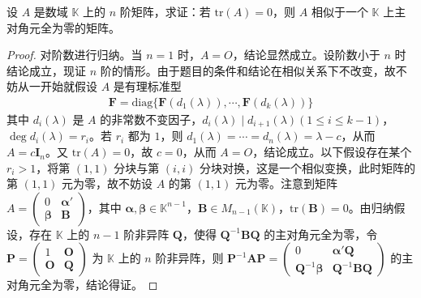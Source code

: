 \documentclass[../../main.tex]{subfiles}
\begin{document}
\begin{proposition}\label{proposition:迹零阵必相似于主对角全为零的矩阵}
设 $A$ 是数域 $\mathbb{K}$ 上的 $n$ 阶矩阵，求证：若 $\mathrm{tr}(A)=0$，则 $A$ 相似于一个 $\mathbb{K}$ 上主对角元全为零的矩阵。
\end{proposition}
\begin{proof}
对阶数进行归纳。当 $n = 1$ 时，$A = O$，结论显然成立。设阶数小于 $n$ 时结论成立，现证 $n$ 阶的情形。由于题目的条件和结论在相似关系下不改变，故不妨从一开始就假设 $A$ 是有理标准型
\begin{align*}
\boldsymbol{F}=\mathrm{diag}\{\boldsymbol{F}(d_1(\lambda)),\cdots,\boldsymbol{F}(d_k(\lambda))\}
\end{align*}
其中 $d_i(\lambda)$ 是 $A$ 的非常数不变因子，$d_i(\lambda)\mid d_{i + 1}(\lambda) (1\leq i\leq k - 1)$，$\deg d_i(\lambda)=r_i$。若 $r_i$ 都为 $1$，则 $d_1(\lambda)=\cdots = d_n(\lambda)=\lambda - c$，从而 $A = c\boldsymbol{I}_n$。又 $\mathrm{tr}(A)=0$，故 $c = 0$，从而 $A = O$，结论成立。以下假设存在某个 $r_i>1$，将第 $(1,1)$ 分块与第 $(i,i)$ 分块对换，这是一个相似变换，此时矩阵的第 $(1,1)$ 元为零，故不妨设 $A$ 的第 $(1,1)$ 元为零。注意到矩阵 $A=\begin{pmatrix}
0 & \boldsymbol{\alpha}' \\
\boldsymbol{\beta} & \boldsymbol{B}
\end{pmatrix}$，其中 $\boldsymbol{\alpha},\boldsymbol{\beta}\in\mathbb{K}^{n - 1}$，$\boldsymbol{B}\in M_{n - 1}(\mathbb{K})$，$\mathrm{tr}(\boldsymbol{B})=0$。由归纳假设，存在 $\mathbb{K}$ 上的 $n - 1$ 阶非异阵 $\boldsymbol{Q}$，使得 $\boldsymbol{Q}^{-1}\boldsymbol{B}\boldsymbol{Q}$ 的主对角元全为零，令 $\boldsymbol{P}=\begin{pmatrix}
1 & \boldsymbol{O} \\
\boldsymbol{O} & \boldsymbol{Q}
\end{pmatrix}$ 为 $\mathbb{K}$ 上的 $n$ 阶非异阵，则 $\boldsymbol{P}^{-1}\boldsymbol{A}\boldsymbol{P}=\begin{pmatrix}
0 & \boldsymbol{\alpha}'\boldsymbol{Q} \\
\boldsymbol{Q}^{-1}\boldsymbol{\beta} & \boldsymbol{Q}^{-1}\boldsymbol{B}\boldsymbol{Q}
\end{pmatrix}$ 的主对角元全为零，结论得证。
\end{proof}
\end{document}
